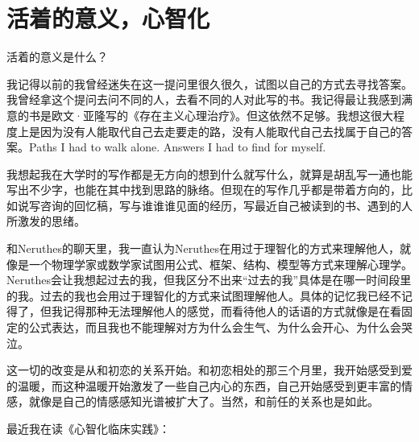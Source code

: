 \chapter{活着的意义，心智化}


活着的意义是什么？

我记得以前的我曾经迷失在这一提问里很久很久，试图以自己的方式去寻找答案。我曾经拿这个提问去问不同的人，去看不同的人对此写的书。我记得最让我感到满意的书是欧文·亚隆写的《存在主义心理治疗》。但这依然不足够。我想这很大程度上是因为没有人能取代自己去走要走的路，没有人能取代自己去找属于自己的答案。Paths I had to walk alone. Answers I had to find for myself.

我想起我在大学时的写作都是无方向的\pozhehao{}想到什么就写什么，就算是胡乱写一通也能写出不少字，也能在其中找到思路的脉络。但现在的写作几乎都是带着方向的，比如说写咨询的回忆稿，写与谁谁谁见面的经历，写最近自己被读到的书、遇到的人所激发的思绪。

和Neruthes的聊天里，我一直认为Neruthes在用过于理智化的方式来理解他人，就像是一个物理学家或数学家试图用公式、框架、结构、模型等方式来理解心理学。Neruthes会让我想起过去的我，但我区分不出来“过去的我”具体是在哪一时间段里的我。过去的我也会用过于理智化的方式来试图理解他人。具体的记忆我已经不记得了，但我记得那种无法理解他人的感觉，而看待他人的话语的方式就像是在看固定的公式表达，而且我也不能理解对方为什么会生气、为什么会开心、为什么会哭泣。

这一切的改变是从和初恋的关系开始。和初恋相处的那三个月里，我开始感受到爱的温暖，而这种温暖开始激发了一些自己内心的东西，自己开始感受到更丰富的情感，就像是自己的情感感知光谱被扩大了。当然，和前任的关系也是如此。

最近我在读《心智化临床实践》：

